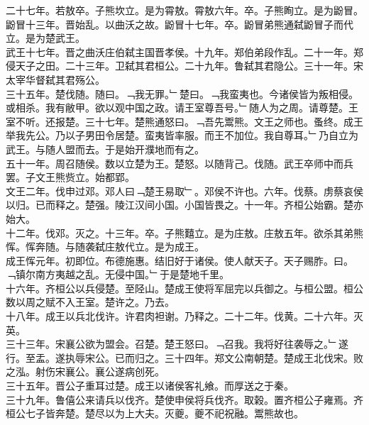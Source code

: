 \documentclass{zhvt-classic}
\begin{document}
\hspace*{2em}二十七年。若敖卒。子熊坎立。是为霄敖。霄敖六年。卒。子熊眴立。是为鼢冒。鼢冒十三年。晋始乱。以曲沃之故。鼢冒十七年。卒。鼢冒弟熊通弑鼢冒子而代立。是为楚武王。\\
\hspace*{2em}武王十七年。晋之曲沃庄伯弑主国晋孝侯。十九年。郑伯弟段作乱。二十一年。郑侵天子之田。二十三年。卫弑其君桓公。二十九年。鲁弑其君隐公。三十一年。宋太宰华督弑其君殇公。\\
\hspace*{2em}三十五年。楚伐随。随曰。﹁我无罪。﹂楚曰。﹁我蛮夷也。今诸侯皆为叛相侵。或相杀。我有敝甲。欲以观中国之政。请王室尊吾号。﹂随人为之周。请尊楚。王室不听。还报楚。三十七年。楚熊通怒曰。﹁吾先鬻熊。文王之师也。蚤终。成王举我先公。乃以子男田令居楚。蛮夷皆率服。而王不加位。我自尊耳。﹂乃自立为武王。与随人盟而去。于是始开濮地而有之。\\
\hspace*{2em}五十一年。周召随侯。数以立楚为王。楚怒。以随背己。伐随。武王卒师中而兵罢。子文王熊赀立。始都郢。\\
\hspace*{2em}文王二年。伐申过邓。邓人曰﹁楚王易取﹂。邓侯不许也。六年。伐蔡。虏蔡哀侯以归。已而释之。楚强。陵江汉间小国。小国皆畏之。十一年。齐桓公始霸。楚亦始大。\\
\hspace*{2em}十二年。伐邓。灭之。十三年。卒。子熊囏立。是为庄敖。庄敖五年。欲杀其弟熊恽。恽奔随。与随袭弑庄敖代立。是为成王。\\
\hspace*{2em}成王恽元年。初即位。布德施惠。结旧好于诸侯。使人献天子。天子赐胙。曰。﹁镇尔南方夷越之乱。无侵中国。﹂于是楚地千里。\\
\hspace*{2em}十六年。齐桓公以兵侵楚。至陉山。楚成王使将军屈完以兵御之。与桓公盟。桓公数以周之赋不入王室。楚许之。乃去。\\
\hspace*{2em}十八年。成王以兵北伐许。许君肉袒谢。乃释之。二十二年。伐黄。二十六年。灭英。\\
\hspace*{2em}三十三年。宋襄公欲为盟会。召楚。楚王怒曰。﹁召我。我将好往袭辱之。﹂遂行。至盂。遂执辱宋公。已而归之。三十四年。郑文公南朝楚。楚成王北伐宋。败之泓。射伤宋襄公。襄公遂病创死。\\
\hspace*{2em}三十五年。晋公子重耳过楚。成王以诸侯客礼飨。而厚送之于秦。\\
\hspace*{2em}三十九年。鲁僖公来请兵以伐齐。楚使申侯将兵伐齐。取榖。置齐桓公子雍焉。齐桓公七子皆奔楚。楚尽以为上大夫。灭夔。夔不祀祝融。鬻熊故也。\\
\end{document}
